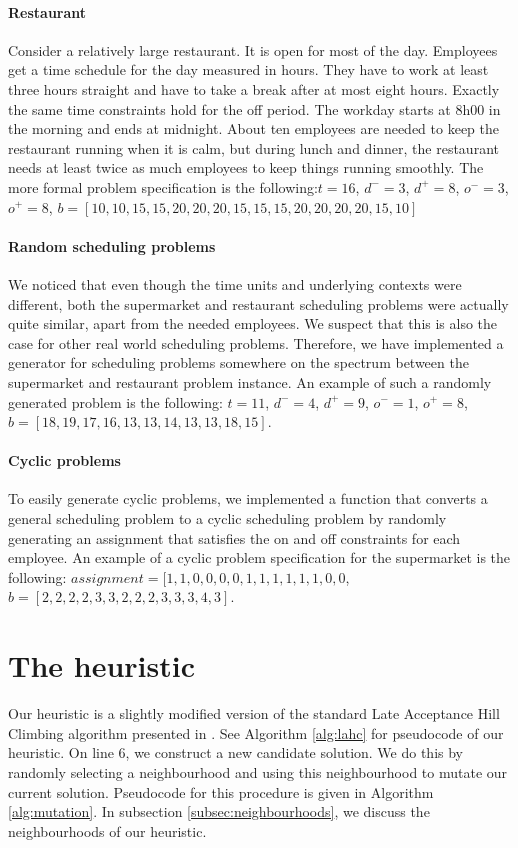 \documentclass[]{article}
\begin{document}
\paragraph{Restaurant}
Consider a relatively large restaurant. It is open for most of the day. Employees get a time schedule for the day measured in hours. They have to work at least three hours straight and have to take a break after at most eight hours. Exactly the same time constraints hold for the off period. The workday starts at 8h00 in the morning and ends at midnight. About ten employees are needed to keep the restaurant running when it is calm, but during lunch and dinner, the restaurant needs at least twice as much employees to keep things running smoothly.
The more formal problem specification is the following:$t=16$, $d^- = 3$, $d^+ = 8$, $o^- = 3$, $o^+ = 8$, $b = [10,10,15,15,20,20,20,15,15,15,20,20,20,20,15,10]$

\paragraph{Random scheduling problems}
We noticed that even though the time units and underlying contexts were different, both the supermarket and restaurant scheduling problems were actually quite similar, apart from the needed employees. We suspect that this is also the case for other real world scheduling problems. Therefore, we have implemented a generator for scheduling problems somewhere on the spectrum between the supermarket and restaurant problem instance. An example of such a randomly generated problem is the following: $t=11$, $d^- = 4$, $d^+ = 9$, $o^- = 1$, $o^+ = 8$, $b = [18,19,17,16,13,13,14,13,13,18,15]$.

\paragraph{Cyclic problems}
To easily generate cyclic problems, we implemented a function that converts a general scheduling problem to a cyclic scheduling problem by randomly generating an assignment that satisfies the on and off constraints for each employee.
An example of a cyclic problem specification for the supermarket is the following:
$assignment = [1,1,0,0,0,0,1,1,1,1,1,1,0,0$, $b = [2,2,2,2,3,3,2,2,2,3,3,3,4,3]$.

\section{The heuristic}
Our heuristic is a slightly modified version of the standard Late Acceptance Hill Climbing algorithm presented in \cite{burke2012late}. See Algorithm \ref{alg:lahc} for pseudocode of our heuristic. On line 6, we construct a new candidate solution. We do this by randomly selecting a neighbourhood and using this neighbourhood to mutate our current solution. Pseudocode for this procedure is given in Algorithm \ref{alg:mutation}. In subsection \ref{subsec:neighbourhoods}, we discuss the neighbourhoods of our heuristic.
\end{document}
